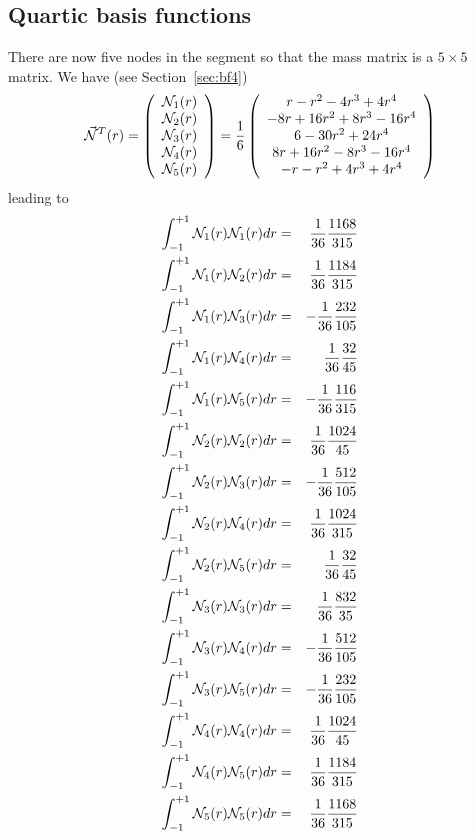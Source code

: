 \subsection{Quartic basis functions}
There are now five nodes in the segment so that the mass matrix 
is a $5\times5$ matrix. We have (see Section~\ref{sec:bf4}) 
\begin{equation}
{\vec {{\mathcal{N}}}}^T(r) = 
\left(
\begin{array}{c}
{\mathcal{N}}_1(r) \\ 
{\mathcal{N}}_2(r) \\ 
{\mathcal{N}}_3(r) \\ 
{\mathcal{N}}_4(r) \\ 
{\mathcal{N}}_5(r) 
\end{array}
\right)
=
\frac{1}{6}
\left(
\begin{array}{c}
  r- r^2 -4r^3 +4r^4 \\
  -8r+16 r^2 +8r^3 -16 r^4  \\
6 -30r^2+24r^4   \\
  8r+16 r^2 -8r^3 -16 r^4  \\
  -r- r^2 +4r^3 +4r^4
\end{array}
\right)
\end{equation}
leading to
\begin{eqnarray}
\int_{-1}^{+1} {\mathcal{N}}_1(r) {\mathcal{N}}_1(r) dr &=& \frac{1}{36}\frac{1168}{315} \nonumber\\ 
\int_{-1}^{+1} {\mathcal{N}}_1(r) {\mathcal{N}}_2(r) dr &=& \frac{1}{36}\frac{1184}{315} \nonumber\\ 
\int_{-1}^{+1} {\mathcal{N}}_1(r) {\mathcal{N}}_3(r) dr &=&-\frac{1}{36}\frac{232}{105}  \nonumber\\ 
\int_{-1}^{+1} {\mathcal{N}}_1(r) {\mathcal{N}}_4(r) dr &=& \frac{1}{36}\frac{32}{45}    \nonumber\\ 
\int_{-1}^{+1} {\mathcal{N}}_1(r) {\mathcal{N}}_5(r) dr &=&-\frac{1}{36}\frac{116}{315}  \nonumber\\ 
\int_{-1}^{+1} {\mathcal{N}}_2(r) {\mathcal{N}}_2(r) dr &=& \frac{1}{36}\frac{1024}{45}  \nonumber\\ 
\int_{-1}^{+1} {\mathcal{N}}_2(r) {\mathcal{N}}_3(r) dr &=&-\frac{1}{36}\frac{512}{105}  \nonumber\\ 
\int_{-1}^{+1} {\mathcal{N}}_2(r) {\mathcal{N}}_4(r) dr &=& \frac{1}{36}\frac{1024}{315} \nonumber\\ 
\int_{-1}^{+1} {\mathcal{N}}_2(r) {\mathcal{N}}_5(r) dr &=& \frac{1}{36}\frac{32}{45}    \nonumber\\ 
\int_{-1}^{+1} {\mathcal{N}}_3(r) {\mathcal{N}}_3(r) dr &=& \frac{1}{36}\frac{832}{35}    \nonumber\\ 
\int_{-1}^{+1} {\mathcal{N}}_3(r) {\mathcal{N}}_4(r) dr &=& -\frac{1}{36}\frac{512}{105}    \nonumber\\ 
\int_{-1}^{+1} {\mathcal{N}}_3(r) {\mathcal{N}}_5(r) dr &=& -\frac{1}{36}\frac{232}{105}    \nonumber\\ 
\int_{-1}^{+1} {\mathcal{N}}_4(r) {\mathcal{N}}_4(r) dr &=& \frac{1}{36}\frac{1024}{45}    \nonumber\\ 
\int_{-1}^{+1} {\mathcal{N}}_4(r) {\mathcal{N}}_5(r) dr &=& \frac{1}{36}\frac{1184}{315}    \nonumber\\ 
\int_{-1}^{+1} {\mathcal{N}}_5(r) {\mathcal{N}}_5(r) dr &=& \frac{1}{36}\frac{1168}{315}    
\end{eqnarray}
